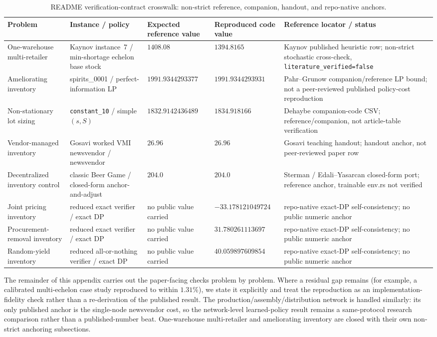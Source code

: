 \documentclass[11pt]{article}
\begin{document}
\begin{table}[!htbp]
\centering
\scriptsize
\setlength{\tabcolsep}{3pt}
\caption{README verification-contract crosswalk: non-strict reference, companion, handout, and repo-native anchors.}
\label{tab:validation-crosswalk-reference}
\begin{tabular}{p{}p{}p{}p{}p{}}
\toprule
Problem & Instance / policy & Expected reference value & Reproduced code value & Reference locator / status \\
\midrule
One-warehouse multi-retailer & Kaynov instance~7 / min-shortage echelon base stock & $1408.08$ & $1394.8165$ & Kaynov published heuristic row; non-strict stochastic cross-check, \texttt{literature\_verified=false} \\
Ameliorating inventory & spirits\_0001 / perfect-information LP & $1991.9344293377$ & $1991.9344293931$ & Pahr--Grunow companion/reference LP bound; not a peer-reviewed published policy-cost reproduction \\
Non-stationary lot sizing & \texttt{constant\_10} / simple $(s,S)$ & $1832.9142436489$ & $1834.918166$ & Dehaybe companion-code CSV; reference/companion, not article-table verification \\
Vendor-managed inventory & Gosavi worked VMI newsvendor / newsvendor & $26.96$ & $26.96$ & Gosavi teaching handout; handout anchor, not peer-reviewed paper row \\
Decentralized inventory control & classic Beer Game / closed-form anchor-and-adjust & $204.0$ & $204.0$ & Sterman / Edali--Yasarcan closed-form port; reference anchor, trainable env.rs not verified \\
Joint pricing inventory & reduced exact verifier / exact DP & no public value carried & $-33.178121049724$ & repo-native exact-DP self-consistency; no public numeric anchor \\
Procurement-removal inventory & reduced exact verifier / exact DP & no public value carried & $31.780261113697$ & repo-native exact-DP self-consistency; no public numeric anchor \\
Random-yield inventory & reduced all-or-nothing verifier / exact DP & no public value carried & $40.059897609854$ & repo-native exact-DP self-consistency; no public numeric anchor \\
\bottomrule
\end{tabular}
\end{table}
\FloatBarrier

The remainder of this appendix carries out the paper-facing checks problem by problem. Where a
residual gap remains (for example, a calibrated multi-echelon case study reproduced to within
$1.31\%$), we state it explicitly and treat the reproduction as an implementation-fidelity check
rather than a re-derivation of the published result. The production/assembly/distribution network is
handled similarly: its only published anchor is the single-node newsvendor cost, so the network-level
learned-policy result remains a same-protocol research comparison rather than a published-number
beat. One-warehouse multi-retailer and ameliorating inventory are closed with their own non-strict
anchoring subsections.
\end{document}

